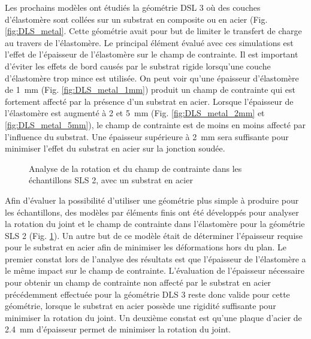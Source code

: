 Les prochains modèles ont étudiés la géométrie DSL 3 où des couches d'élastomère sont collées sur un substrat en composite ou en acier (Fig. \ref{fig:DLS_metal}. 
Cette géométrie avait pour but de limiter le transfert de charge au travers de l'élastomère. 
Le principal élément évalué avec ces simulations est l'effet de l'épaisseur de l'élastomère sur le champ de contrainte. 
Il est important d'éviter les effets de bord causés par le substrat rigide lorsqu'une couche d'élastomère trop mince est utilisée. 
On peut voir qu'une épaisseur d'élastomère de \SI{1}{\milli\metre} (Fig. \ref{fig:DLS_metal_1mm}) produit un champ de contrainte qui est fortement affecté par la présence d'un substrat en acier. 
Lorsque l'épaisseur de l'élastomère est augmenté à 2 et \SI{5}{\milli\metre} (Fig. \ref{fig:DLS_metal_2mm} et \ref{fig:DLS_metal_5mm}), le champ de contrainte est de moins en moins affecté par l'influence du substrat. 
Une épaisseur supérieure à \SI{2}{\milli\metre} sera suffisante pour minimiser l'effet du substrat en acier sur la jonction soudée. 



\begin{figure}[h]
	\centering
	\qquad
	\caption{Analyse de la rotation et du champ de contrainte dans les échantillons SLS 2, avec un substrat en acier}
	\label{fig:SLS_metal}
\end{figure}

Afin d'évaluer la possibilité d'utiliser une géométrie plus simple à produire pour les échantillons, des modèles par éléments finis ont été développés pour analyser la rotation du joint et le champ de contrainte dans l'élastomère pour la géométrie SLS 2 (Fig. \ref{fig:SLS_metal}). 
Un autre but de ce modèle était de déterminer l'épaisseur requise pour le substrat en acier afin de minimiser les déformations hors du plan.  
Le premier constat lors de l'analyse des résultats est que l'épaisseur de l'élastomère a le même impact sur le champ de contrainte. 
L'évaluation de l'épaisseur nécessaire pour obtenir un champ de contrainte non affecté par le substrat en acier précédemment effectuée pour la géométrie DLS 3 reste donc valide pour cette géométrie, lorsque le substrat en acier possède une rigidité suffisante pour minimiser la rotation du joint. 
Un deuxième constat est qu'une plaque d'acier de \SI{2.4}{\milli\metre} d'épaisseur permet de minimiser la rotation du joint. 

